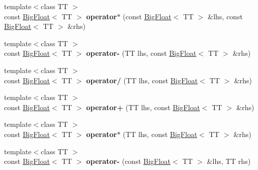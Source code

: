 \begin{DoxyCompactItemize}
\item 
\hypertarget{classatl_1_1_big_float_afbca6aa46b3079b3fc486b4e9ad5a661}{{\footnotesize template$<$class T\+T $>$ }\\const \hyperlink{classatl_1_1_big_float}{Big\+Float}$<$ T\+T $>$ {\bfseries operator$\ast$} (const \hyperlink{classatl_1_1_big_float}{Big\+Float}$<$ T\+T $>$ \&lhs, const \hyperlink{classatl_1_1_big_float}{Big\+Float}$<$ T\+T $>$ \&rhs)}\label{classatl_1_1_big_float_afbca6aa46b3079b3fc486b4e9ad5a661}

\item 
\hypertarget{classatl_1_1_big_float_ae79946fdfa5b9a90da8540d474698661}{{\footnotesize template$<$class T\+T $>$ }\\const \hyperlink{classatl_1_1_big_float}{Big\+Float}$<$ T\+T $>$ {\bfseries operator-\/} (T\+T lhs, const \hyperlink{classatl_1_1_big_float}{Big\+Float}$<$ T\+T $>$ \&rhs)}\label{classatl_1_1_big_float_ae79946fdfa5b9a90da8540d474698661}

\item 
\hypertarget{classatl_1_1_big_float_a1f5c9a2994a95a4b9d359474b8b66f88}{{\footnotesize template$<$class T\+T $>$ }\\const \hyperlink{classatl_1_1_big_float}{Big\+Float}$<$ T\+T $>$ {\bfseries operator/} (T\+T lhs, const \hyperlink{classatl_1_1_big_float}{Big\+Float}$<$ T\+T $>$ \&rhs)}\label{classatl_1_1_big_float_a1f5c9a2994a95a4b9d359474b8b66f88}

\item 
\hypertarget{classatl_1_1_big_float_a5751e349f60ca9cbf284d8558d7b5611}{{\footnotesize template$<$class T\+T $>$ }\\const \hyperlink{classatl_1_1_big_float}{Big\+Float}$<$ T\+T $>$ {\bfseries operator+} (T\+T lhs, const \hyperlink{classatl_1_1_big_float}{Big\+Float}$<$ T\+T $>$ \&rhs)}\label{classatl_1_1_big_float_a5751e349f60ca9cbf284d8558d7b5611}

\item 
\hypertarget{classatl_1_1_big_float_a120b4de622c5407157f7cb43c94b749e}{{\footnotesize template$<$class T\+T $>$ }\\const \hyperlink{classatl_1_1_big_float}{Big\+Float}$<$ T\+T $>$ {\bfseries operator$\ast$} (T\+T lhs, const \hyperlink{classatl_1_1_big_float}{Big\+Float}$<$ T\+T $>$ \&rhs)}\label{classatl_1_1_big_float_a120b4de622c5407157f7cb43c94b749e}

\item 
\hypertarget{classatl_1_1_big_float_a643c84dafd034252ce11c7f25a702909}{{\footnotesize template$<$class T\+T $>$ }\\const \hyperlink{classatl_1_1_big_float}{Big\+Float}$<$ T\+T $>$ {\bfseries operator-\/} (const \hyperlink{classatl_1_1_big_float}{Big\+Float}$<$ T\+T $>$ \&lhs, T\+T rhs)}\label{classatl_1_1_big_float_a643c84dafd034252ce11c7f25a702909}


\end{DoxyCompactItemize}
